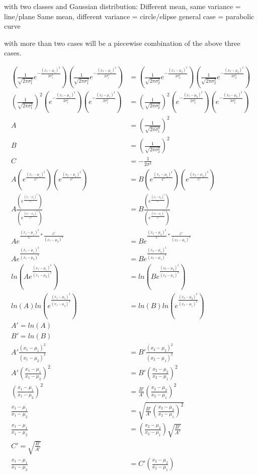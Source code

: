 \documentclass[10pt,a4paper]{article}
\begin{document}
	with two classes and Gaussian distribution:
	Different mean, same variance = line/plane
	Same mean, different variance = circle/elipse
	general case = parabolic curve
	
	with more than two cases will be a piecewise combination of the above three cases.
	
	\begin{align*}
(\frac{1}{\sqrt{2\pi\sigma_1^2}}e^{-\frac{(x_1-\mu_1)^2}{2\sigma_1^2}})(\frac{1}{\sqrt{2\pi\sigma_1^2}}e^{-\frac{(x_2-\mu_1)^2}{2\sigma_1^2}}) &= (\frac{1}{\sqrt{2\pi\sigma_2^2}}e^{-\frac{(x_1-\mu_2)^2}{2\sigma_2^2}})(\frac{1}{\sqrt{2\pi\sigma_2^2}}e^{-\frac{(x_2-\mu_2)^2}{2\sigma_2^2}})\\
(\frac{1}{\sqrt{2\pi\sigma_1^2}})^2(e^{-\frac{(x_1-\mu_1)^2}{2\sigma_1^2}})(e^{-\frac{(x_2-\mu_1)^2}{2\sigma_1^2}}) &= (\frac{1}{\sqrt{2\pi\sigma_2^2}})^2(e^{-\frac{(x_1-\mu_2)^2}{2\sigma_2^2}})(e^{-\frac{(x_2-\mu_2)^2}{2\sigma_2^2}})\\
	A &= (\frac{1}{\sqrt{2\pi\sigma_1^2}})^2\\
	B &= (\frac{1}{\sqrt{2\pi\sigma_2^2}})^2\\
	C &= -\frac{1}{2\sigma^2}\\
	A(e^{\frac{(x_1-\mu_1)^2}{C}})(e^{\frac{(x_2-\mu_1)^2}{C}}) &= B(e^{\frac{(x_1-\mu_2)^2}{C}})(e^{\frac{(x_2-\mu_2)^2}{C}})\\
	A\frac{(e^{\frac{(x_1-\mu_1)^2}{C}})}{(e^{\frac{(x_1-\mu_2)^2}{C}})} &= B\frac{(e^{\frac{(x_2-\mu_2)^2}{C}})}{(e^{\frac{(x_2-\mu_1)^2}{C}})}\\
	Ae^{\frac{(x_1-\mu_1)^2}{C}*\frac{C}{(x_1-\mu_2)^2}} &= Be^{\frac{(x_2-\mu_2)^2}{C}*\frac{C}{(x_2-\mu_1)^2}}\\
	Ae^{\frac{(x_1-\mu_1)^2}{(x_1-\mu_2)^2}} &= Be^{\frac{(x_2-\mu_2)^2}{(x_2-\mu_1)^2}}\\
	ln(Ae^{\frac{(x_1-\mu_1)^2}{(x_1-\mu_2)^2}}) &= ln(Be^{\frac{(x_2-\mu_2)^2}{(x_2-\mu_1)^2}})\\
	ln(A)ln(e^{\frac{(x_1-\mu_1)^2}{(x_1-\mu_2)^2}}) &= ln(B)ln(e^{\frac{(x_2-\mu_2)^2}{(x_2-\mu_1)^2}})\\
	A'=ln(A)\\
	B'=ln(B)\\
	A'\frac{(x_1-\mu_1)^2}{(x_1-\mu_2)^2} &= B'\frac{(x_2-\mu_2)^2}{(x_2-\mu_1)^2}\\
	A'(\frac{x_1-\mu_1}{x_1-\mu_2})^2 &= B'(\frac{x_2-\mu_2}{x_2-\mu_1})^2\\
	(\frac{x_1-\mu_1}{x_1-\mu_2})^2 &= \frac{B'}{A'}(\frac{x_2-\mu_2}{x_2-\mu_1})^2\\
	\frac{x_1-\mu_1}{x_1-\mu_2} &= \sqrt{\frac{B'}{A'}(\frac{x_2-\mu_2}{x_2-\mu_1})^2}\\
	\frac{x_1-\mu_1}{x_1-\mu_2} &= (\frac{x_2-\mu_2}{x_2-\mu_1})\sqrt{\frac{B'}{A'}}\\
	C' = \sqrt{\frac{B'}{A'}}\\
	\frac{x_1-\mu_1}{x_1-\mu_2} &= C'(\frac{x_2-\mu_2}{x_2-\mu_1})\\
	\end{align*}
	
\end{document}
